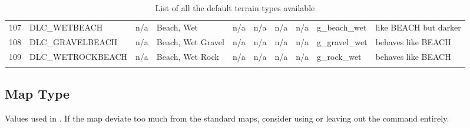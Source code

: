 \begin{appendices}
\begin{landscape}
\begin{longtable}{@{}p{5mm}|p{25mm}p{23mm}|p{14mm}p{14mm}p{14mm}p{14mm}|p{10mm}p{15mm}|p{45mm}@{}}
            107	& DLC\_WETBEACH	& n/a	& Beach, Wet	& n/a	& n/a	& n/a	& n/a	& g\_beach\_wet		& like BEACH but darker \\
            108	& DLC\_GRAVELBEACH	& n/a	& Beach, Wet Gravel	& n/a	& n/a	& n/a	& n/a	& g\_gravel\_wet		& behaves like BEACH \\
            109	& DLC\_WETROCKBEACH	& n/a	& Beach, Wet Rock	& n/a	& n/a	& n/a	& n/a	& g\_rock\_wet		& behaves like BEACH \\
            \bottomrule
            \caption{List of all the default terrain types available}
            \label{tbl:terrain}
        \end{longtable}
        
    \end{landscape}

    \subsection{Map Type}
    \label{subsection:maptype}

    Values used in . If the map deviate too much from the standard maps, consider using  or leaving out the command entirely.


\end{appendices}
